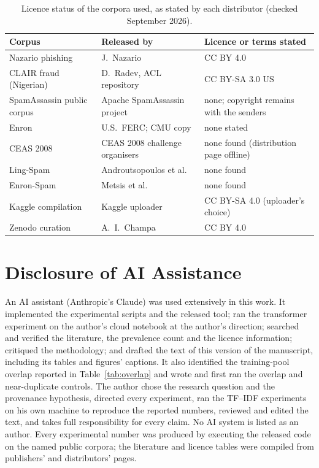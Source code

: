 \documentclass[twoside,11pt]{article}
\begin{document}
\begin{table}[t]
\centering\small
\caption{Licence status of the corpora used, as stated by each distributor
(checked September 2026).}
\label{tab:licences}
\begin{tabular}{p{}p{}p{}}
\toprule
Corpus & Released by & Licence or terms stated \\
\midrule
Nazario phishing~\citep{nazario_corpus} & J.\ Nazario & CC BY 4.0 \\
CLAIR fraud (Nigerian)~\citep{radev2008clair} & D.\ Radev, ACL repository & CC BY-SA 3.0 US \\
SpamAssassin public corpus~\citep{spamassassin_corpus} & Apache SpamAssassin project & none; copyright remains with the senders \\
Enron~\citep{klimt2004} & U.S.\ FERC; CMU copy & none stated \\
CEAS 2008~\citep{ceas2008_corpus} & CEAS 2008 challenge organisers & none found (distribution page offline) \\
Ling-Spam~\citep{androutsopoulos2000lingspam} & Androutsopoulos et al. & none found \\
Enron-Spam~\citep{metsis2006enronspam} & Metsis et al. & none found \\
Kaggle compilation~\citep{alsubaiey2024novel} & Kaggle uploader & CC BY-SA 4.0 (uploader's choice) \\
Zenodo curation~\citep{champa_zenodo} & A.\ I.\ Champa & CC BY 4.0 \\
\bottomrule
\end{tabular}
\end{table}

\section*{Disclosure of AI Assistance}

An AI assistant (Anthropic's Claude) was used extensively in this work. It
implemented the experimental scripts and the released tool; ran the
transformer experiment on the author's cloud notebook at the author's
direction; searched and verified the literature, the prevalence count and the
licence information; critiqued the methodology; and drafted the text of this
version of the manuscript, including its tables and figures' captions. It also
identified the training-pool overlap reported in Table~\ref{tab:overlap} and
wrote and first ran the overlap and near-duplicate controls. The
author chose the research question and the provenance hypothesis, directed
every experiment, ran the TF--IDF experiments on his own machine to reproduce
the reported numbers, reviewed and edited the text, and takes full
responsibility for every claim. No AI system is listed as an author. Every
experimental number was produced by executing the released code on the named
public corpora; the literature and licence tables were compiled from
publishers' and distributors' pages.
\end{document}
